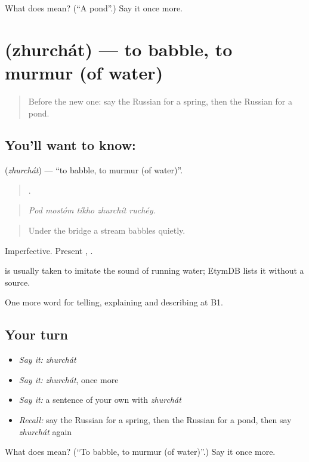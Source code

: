 \begin{tcolorbox}[breakable,colback=teal!4,colframe=teal!35!black,title={Before you move on}]
What does  mean? (\textquotedblleft{}A pond\textquotedblright{}.) Say it once more.
\end{tcolorbox}
\section[\texorpdfstring{\ru{журчать} (zhurchát)}{журчать (zhurchát)}]{ (zhurchát) — to babble, to murmur (of water)}

\label{lesson:RU-C460-zhurchat}



\begin{quote}
Before the new one: say the Russian for a spring, then the Russian for a pond.
\end{quote}

\subsection*{You'll want to know: }
\textbf{} (\emph{zhurchát}) — \textquotedblleft{}to babble, to murmur (of water)\textquotedblright{}.

\begin{quote}
    .
\end{quote}

\begin{quote}
\emph{Pod mostóm tíkho zhurchít ruchéy.}
\end{quote}

\begin{quote}
Under the bridge a stream babbles quietly.
\end{quote}

Imperfective. Present \emph{}, \emph{}.

\begin{cousinweb}
\emph{} is usually taken to imitate the sound of running water; EtymDB lists it without a source.
\end{cousinweb}

\begin{grammarlens}[title={What you've built}]
One more word for telling, explaining and describing at B1.
\end{grammarlens}

\subsection*{Your turn}
\begin{itemize}
\raggedright
  \item \emph{Say it:} \emph{zhurchát}
  \item \emph{Say it:} \emph{zhurchát}, once more
  \item \emph{Say it:} a sentence of your own with \emph{zhurchát}
  \item \emph{Recall:} say the Russian for a spring, then the Russian for a pond, then say \emph{zhurchát} again
\end{itemize}

\begin{tcolorbox}[breakable,colback=teal!4,colframe=teal!35!black,title={Before you move on}]
What does  mean? (\textquotedblleft{}To babble, to murmur (of water)\textquotedblright{}.) Say it once more.
\end{tcolorbox}

